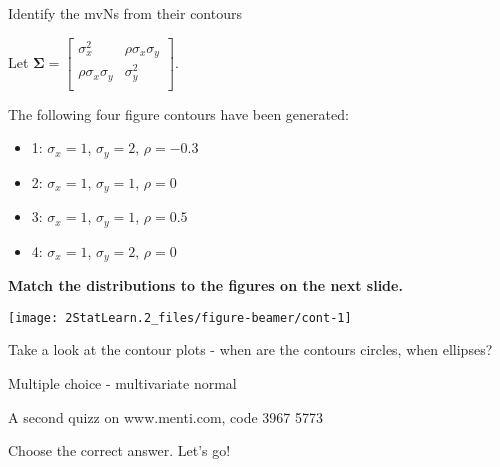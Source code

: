 \documentclass[ignorenonframetext,]{beamer}
\providecommand{\tightlist}{%
  \setlength{\itemsep}{0pt}\setlength{\parskip}{0pt}}
\begin{document}
\begin{frame}

\begin{block}{Identify the mvNs from their contours}

\vspace{4mm}

Let
\(\boldsymbol\Sigma=\left[\begin{array}{cc} \sigma_x^2 & \rho\sigma_{x}\sigma_{y}\\\rho\sigma_{x}\sigma_{y}&\sigma_y^2\\ \end{array} \right]\).

\vspace{4mm}

The following four figure contours have been generated:

\begin{itemize}
\tightlist
\item
  1: \(\sigma_x=1\), \(\sigma_y=2\), \(\rho=-0.3\)
\item
  2: \(\sigma_x=1\), \(\sigma_y=1\), \(\rho=0\)
\item
  3: \(\sigma_x=1\), \(\sigma_y=1\), \(\rho=0.5\)
\item
  4: \(\sigma_x=1\), \(\sigma_y=2\), \(\rho=0\)
\end{itemize}

\vspace{8mm}

\textbf{Match the distributions to the figures on the next slide.}

\end{block}

\end{frame}

\begin{frame}

\begin{center}\texttt{[image: 2StatLearn.2\_files/figure-beamer/cont-1]} \end{center}

Take a look at the contour plots - when are the contours circles, when
ellipses?

\end{frame}

\begin{frame}

\begin{block}{Multiple choice - multivariate normal}

\vspace{2mm}

A second quizz on www.menti.com, code 3967 5773

Choose the correct answer. Let's go!

\end{block}

\end{frame}
\end{document}
